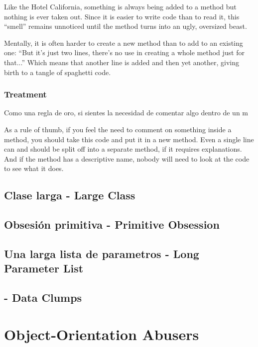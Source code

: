 \documentclass[11pt,a4paper,oneside]{book}
\begin{document}
Like the Hotel California, something is always being added to a method but nothing is ever taken out. Since it is easier to write code than to read it, this “smell” remains unnoticed until the method turns into an ugly, oversized beast.

Mentally, it is often harder to create a new method than to add to an existing one: “But it’s just two lines, there’s no use in creating a whole method just for that...” Which means that another line is added and then yet another, giving birth to a tangle of spaghetti code.

\subsubsection{Treatment}
Como una regla de oro, si sientes la necesidad de comentar algo dentro de un m

As a rule of thumb, if you feel the need to comment on something inside a method, you should take this code and put it in a new method. Even a single line can and should be split off into a separate method, if it requires explanations. And if the method has a descriptive name, nobody will need to look at the code to see what it does.

\subsection{Clase larga -   Large Class}

    
    \subsection{Obsesión primitiva -   Primitive Obsession}

        \subsection{Una larga lista de parametros -   Long Parameter List}
    \subsection{ -   Data Clumps}

    
    
    
    
    




\section{Object-Orientation Abusers}
\end{document}
